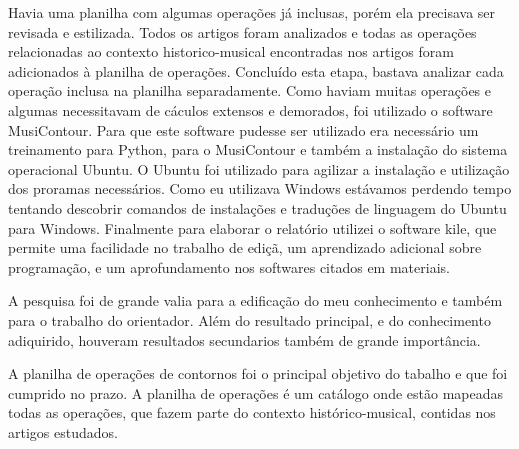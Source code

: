 \documentclass[11pt]{article}
\begin{document}
Havia uma planilha com algumas operações já inclusas, porém ela precisava ser revisada e estilizada.
Todos os artigos foram analizados e todas as operações relacionadas ao contexto historico-musical
encontradas nos artigos foram adicionados à planilha de operações. Concluído esta etapa, bastava analizar
cada operação inclusa na planilha separadamente. Como haviam muitas operações e algumas necessitavam de
cáculos extensos e demorados, foi utilizado o software MusiContour. Para que este software pudesse ser
utilizado era necessário um treinamento para Python, para o MusiContour e também a instalação do
sistema operacional Ubuntu. O Ubuntu foi utilizado para agilizar a instalação e utilização dos proramas
necessários. Como eu utilizava Windows estávamos perdendo tempo tentando descobrir comandos de instalações
e traduções de linguagem do Ubuntu para Windows.
Finalmente para elaborar o relatório utilizei o software kile, que permite uma facilidade no trabalho
de ediçã, um aprendizado adicional sobre programação, e um aprofundamento nos softwares citados em materiais.

\label{sec:resultados}


A pesquisa foi de grande valia para a edificação do meu conhecimento e também para o trabalho do orientador.
Além do resultado principal, e do conhecimento adiquirido, houveram resultados secundarios também de grande
importância.

A planilha de operações de contornos foi o principal objetivo do tabalho e que foi cumprido no prazo. A planilha
de operações é um catálogo onde estão mapeadas todas as operações, que fazem parte do contexto histórico-musical,
contidas nos artigos estudados.
\end{document}
